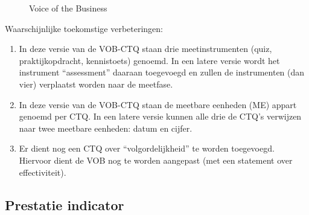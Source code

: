 \documentclass[
  a4paper,
  DIV=11,
  numbers=noendperiod]{scrartcl}
\providecommand{\tightlist}{%
  \setlength{\itemsep}{0pt}\setlength{\parskip}{0pt}}\usepackage{longtable,booktabs,array}
\begin{document}
\begin{figure}


\caption{\label{fig-voc-ctq}Voice of the Business}

\end{figure}%

Waarschijnlijke toekomstige verbeteringen:

\begin{enumerate}
\def\labelenumi{\arabic{enumi}.}
\tightlist
\item
  In deze versie van de VOB-CTQ staan drie meetinstrumenten (quiz,
  praktijkopdracht, kennistoets) genoemd. In een latere versie wordt het
  instrument ``assessment'' daaraan toegevoegd en zullen de instrumenten
  (dan vier) verplaatst worden naar de meetfase.
\item
  In deze versie van de VOB-CTQ staan de meetbare eenheden (ME) appart
  genoemd per CTQ. In een latere versie kunnen alle drie de CTQ's
  verwijzen naar twee meetbare eenheden: datum en cijfer.
\item
  Er dient nog een CTQ over ``volgordelijkheid'' te worden toegevoegd.
  Hiervoor dient de VOB nog te worden aangepast (met een statement over
  effectiviteit).
\end{enumerate}

\newpage

\subsection{Prestatie indicator}\label{prestatie-indicator}
\end{document}
